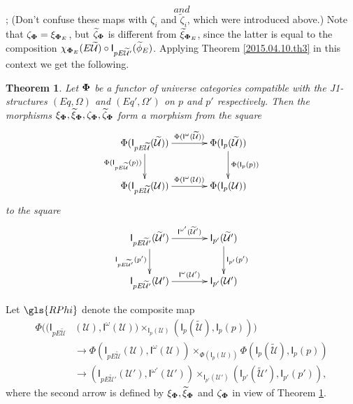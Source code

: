 \documentclass[12pt]{article}
\numberwithin{equation}{section}
\newtheorem{theorem}[proposition]{Theorem}
\newcommand{\sr}{\rightarrow}
\newcommand{\wt}{\widetilde}
\newcommand{\U}{\mathcal{U}}
\newcommand{\I}{\mathsf{I}}
\begin{document}
 $$
and $$;
(Don't confuse these maps with $\zeta_i$ and $\wt\zeta_i$, which were introduced above.)
Note that
$\zeta_{\bf\Phi}=\xi_{{\bf\Phi}_{E}}$, but $\wt{\zeta}_{\bf\Phi}$ is different
from $\wt{\xi}_{{\bf\Phi}_{E}}$, since the latter is equal to the composition
$\chi_{{\bf\Phi}_{E}}(E\wt{\U})\circ \I_{pE\wt{\U}'}(\wt{\phi}_{E})$. Applying
Theorem \ref{2015.04.10.th3} in this context we get the following.
%
\begin{theorem}
\label{2015.04.10.th1} Let ${\bf\Phi}$ be a functor of universe categories
compatible with the J1-structures $(Eq,\Omega)$ and $(Eq',\Omega')$ on $p$ and
$p'$ respectively. Then the morphisms $\xi_{\bf\Phi}, \wt{\xi}_{\bf\Phi},
\zeta_{\bf\Phi}, \wt{\zeta}_{\bf\Phi}$ form a morphism from the square
%
$$
\begin{xy}
          \xymatrix@C=3pc{ \Phi(\I_{pE\wt{\U}}(\wt{\U}))
            \ar[r]^-{\Phi(\I^{\omega}(\wt{\U}))} \ar[d]_{\Phi(\I_{pE\wt{\U}}(p))} &
            \Phi(\I_p(\wt{\U}))\ar[d]^-{\Phi(\I_p(p))}\\ \Phi(\I_{pE\wt{\U}}(\U))
            \ar[r]^-{\Phi(\I^{\omega}(\U))} & \Phi(\I_p(\U)) }
\end{xy}
$$
%
to the square
%
$$
\begin{xy}
          \xymatrix@C=3pc{ \I_{pE\wt{\U}'}(\wt{\U}')
            \ar[r]^-{\I^{\omega'}(\wt{\U}')} \ar[d]_-{\I_{pE\wt{\U}'}(p')} &
            \I_{p'}(\wt{\U}')\ar[d]^-{\I_{p'}(p')}\\ \I_{pE\wt{\U}'}(\U')
            \ar[r]^-{\I^{\omega}(\U')} & \I_{p'}(\U') }
\end{xy}
$$
%
\end{theorem}
%
Let $\gls{RPhi}$ denote the composite map
%
\begin{align}
  \label{RPhi-defn}
  \Phi((\I_{pE\wt{\U}}&(\U), \I^{\omega}(\U))\times_{\I_p(\U)} (\I_p(\wt{\U}), \I_p(p))) \\
      & \sr \Phi(\I_{pE\wt{\U}}(\U), \I^{\omega}(\U))\times_{\Phi(\I_p(\U))}\Phi(\I_p(\wt{\U}), \I_p(p)) \\
      & \sr (\I_{pE\wt{\U}'}(\U'),\I^{\omega'}(\U'))\times_{\I_{p'}(\U')}(\I_{p'}(\wt{\U}'),\I_{p'}(p')),
\end{align}
%
where the second arrow is defined by $\xi_{\bf\Phi}, \wt{\xi}_{\bf\Phi}$ and
$\zeta_{\bf\Phi}$ in view of Theorem \ref{2015.04.10.th1}.
%
\end{document}
